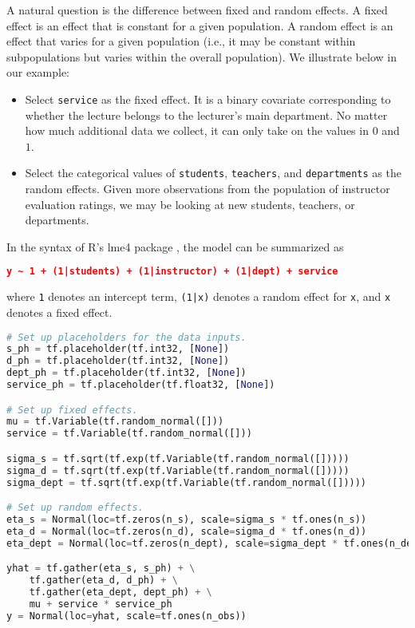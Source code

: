 A natural question is the difference between fixed and random effects.
A fixed effect is an effect that is constant for a given population. A
random effect is an effect that varies for a given population (i.e.,
it may be constant within subpopulations but varies within the overall
population). We illustrate below in our example:

\begin{itemize}
\item
Select \texttt{service} as the fixed effect. It is a binary covariate
corresponding to whether the lecture belongs to the lecturer's main
department. No matter how much additional data we collect, it
can only take on the values in $0$ and $1$.
\item
Select the categorical values of \texttt{students}, \texttt{teachers},
and \texttt{departments} as the random effects. Given more
observations from the population of instructor evaluation ratings, we
may be looking at new students, teachers, or departments.
\end{itemize}

In the syntax of R's lme4 package \citep{bates2015fitting}, the model
can be summarized as

\begin{lstlisting}[language=JSON]
y ~ 1 + (1|students) + (1|instructor) + (1|dept) + service
\end{lstlisting}
where \texttt{1} denotes an intercept term, \texttt{(1|x)} denotes a
random effect for  \texttt{x}, and \texttt{x} denotes a fixed effect.

\begin{lstlisting}[language=Python]
# Set up placeholders for the data inputs.
s_ph = tf.placeholder(tf.int32, [None])
d_ph = tf.placeholder(tf.int32, [None])
dept_ph = tf.placeholder(tf.int32, [None])
service_ph = tf.placeholder(tf.float32, [None])

# Set up fixed effects.
mu = tf.Variable(tf.random_normal([]))
service = tf.Variable(tf.random_normal([]))

sigma_s = tf.sqrt(tf.exp(tf.Variable(tf.random_normal([]))))
sigma_d = tf.sqrt(tf.exp(tf.Variable(tf.random_normal([]))))
sigma_dept = tf.sqrt(tf.exp(tf.Variable(tf.random_normal([]))))

# Set up random effects.
eta_s = Normal(loc=tf.zeros(n_s), scale=sigma_s * tf.ones(n_s))
eta_d = Normal(loc=tf.zeros(n_d), scale=sigma_d * tf.ones(n_d))
eta_dept = Normal(loc=tf.zeros(n_dept), scale=sigma_dept * tf.ones(n_dept))

yhat = tf.gather(eta_s, s_ph) + \
    tf.gather(eta_d, d_ph) + \
    tf.gather(eta_dept, dept_ph) + \
    mu + service * service_ph
y = Normal(loc=yhat, scale=tf.ones(n_obs))
\end{lstlisting}

